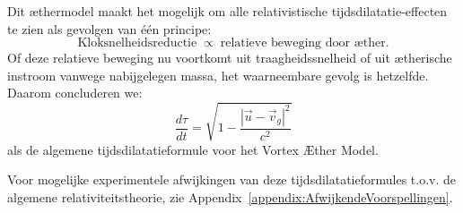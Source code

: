 Dit æthermodel maakt het mogelijk om alle relativistische tijdsdilatatie-effecten te zien als gevolgen van één principe:
\[
    \text{Kloksnelheidsreductie} \;\propto\; \text{relatieve beweging door æther}.
\]
Of deze relatieve beweging nu voortkomt uit traagheidssnelheid of uit ætherische instroom vanwege nabijgelegen massa, het waarneembare gevolg is hetzelfde. Daarom concluderen we:
\[
    \boxed{\frac{d\tau}{dt} = \sqrt{1 - \frac{|\vec{u} - \vec{v}_g|^2}{c^2}}}
\]
als de algemene tijdsdilatatieformule voor het Vortex Æther Model.

Voor mogelijke experimentele afwijkingen van deze tijdsdilatatieformules t.o.v. de algemene relativiteitstheorie, zie Appendix~\ref{appendix:AfwijkendeVoorspellingen}.